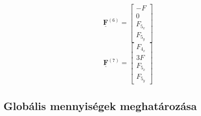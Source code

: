 \documentclass[12pt,a4paper]{article}
\def\vec#1{\underline{\mathbf{#1}}}
\begin{document}
\begin{multicols}{7}
\begin{equation*}
    \end{equation*}
    \columnbreak
    \begin{equation*}
        \vec{F}^{\left(6\right)}=
        \begin{bmatrix}
            -F      \\
            0       \\
            F_{5_x} \\
            F_{5_y}
        \end{bmatrix}
    \end{equation*}
    \columnbreak
    \begin{equation*}
        \vec{F}^{\left(7\right)}=
        \begin{bmatrix}
            F_{4_x} \\
            3 F     \\
            F_{5_x} \\
            F_{5_y}
        \end{bmatrix}
    \end{equation*}
\end{multicols}
\subsection{Globális mennyiségek meghatározása}
\end{document}
